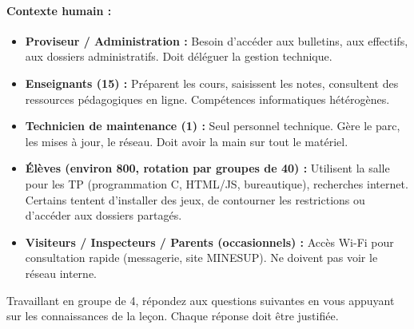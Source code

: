 \documentclass[11pt]{article}
\newcounter{popsec}
\newcounter{popsub}
\newcommand{\courssub}[1]{%
  \stepcounter{popsub}%
  \par\vspace{9pt}\noindent{\popxbold\fontsize{11.5}{13}\selectfont\color{popink}{\color{poporange}\thepopsec.\thepopsub}\hspace{6pt}#1}\par\nopagebreak\vspace{4pt}
}
\begin{document}
\paragraph{Contexte humain :}
\begin{itemize}
    \item \textbf{Proviseur / Administration :} Besoin d'accéder aux bulletins, aux effectifs, aux dossiers administratifs. Doit déléguer la gestion technique.
    \item \textbf{Enseignants (15) :} Préparent les cours, saisissent les notes, consultent des ressources pédagogiques en ligne. Compétences informatiques hétérogènes.
    \item \textbf{Technicien de maintenance (1) :} Seul personnel technique. Gère le parc, les mises à jour, le réseau. Doit avoir la main sur tout le matériel.
    \item \textbf{Élèves (environ 800, rotation par groupes de 40) :} Utilisent la salle pour les TP (programmation C, HTML/JS, bureautique), recherches internet. Certains tentent d'installer des jeux, de contourner les restrictions ou d'accéder aux dossiers partagés.
    \item \textbf{Visiteurs / Inspecteurs / Parents (occasionnels) :} Accès Wi-Fi pour consultation rapide (messagerie, site MINESUP). Ne doivent pas voir le réseau interne.
\end{itemize}

\courssub{Consignes}
Travaillant en groupe de 4, répondez aux questions suivantes en vous appuyant sur les connaissances de la leçon. Chaque réponse doit être justifiée.
\end{document}
